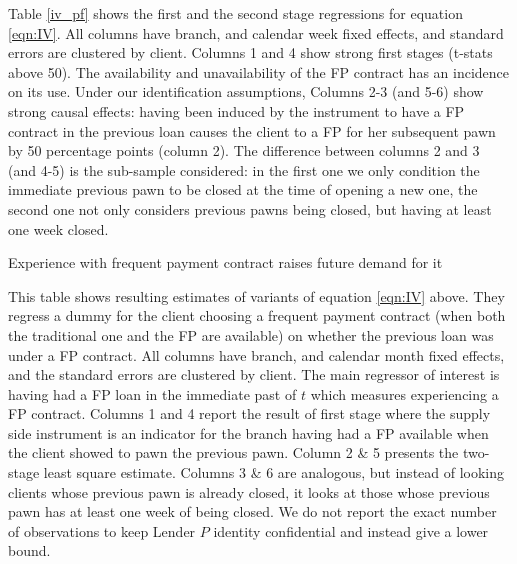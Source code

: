 \documentclass[oneside,11pt]{article}
\begin{document}
Table \ref{iv_pf} shows the first and the second stage regressions for equation \ref{eqn:IV}. All columns have branch, and calendar week fixed effects, and standard errors are clustered by client. Columns 1 and 4 show strong first stages (t-stats above 50). The availability and unavailability of the FP contract has an incidence on its use. Under our identification assumptions, Columns 2-3 (and 5-6) show strong causal effects: having  been induced by the instrument to have a FP contract in the previous loan causes the client to a FP for her subsequent pawn by 50 percentage points (column 2). The difference between columns 2 and 3 (and 4-5) is the sub-sample considered: in the first one we only condition the immediate previous pawn to be closed at the time of opening a new one, the second one not only considers previous pawns being closed, but having at least one week closed.


\begin{table}[H]
\caption{Experience with frequent payment contract raises future demand for it}
\label{iv_pf}
\begin{center}
\footnotesize{}
\end{center}
 \scriptsize
This table shows resulting estimates of variants of equation  \ref{eqn:IV} above. They regress a dummy for the client choosing a frequent payment contract (when both the traditional one and the FP are available) on whether the previous loan was under a FP contract. All columns have branch, and calendar month fixed effects, and the standard errors are clustered by client. The main regressor of interest is having had a FP loan in the immediate past of $t$ which measures experiencing a FP contract. Columns 1 and 4 report the result of first stage where the supply side instrument is an indicator for the branch having had a FP available when the client showed to pawn the previous pawn. Column 2 \& 5 presents the two-stage least square estimate. Columns 3 \& 6 are analogous, but instead of looking clients whose previous pawn is already closed, it looks at those whose previous pawn has at least one week of being closed. We do not report the exact number of observations to keep Lender $P$ identity confidential and instead give a lower bound. 
\end{table}





\end{document}

